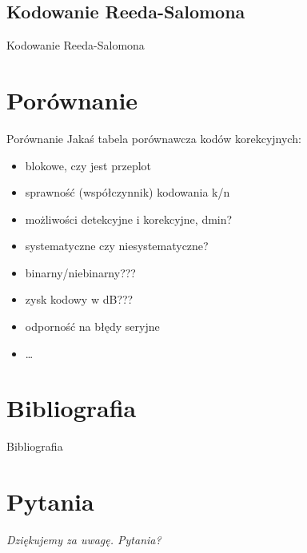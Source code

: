 \documentclass[12pt]{beamer}
\begin{document}
\subsection{Kodowanie Reeda-Salomona}
\begin{frame}{Kodowanie Reeda-Salomona}

\end{frame}

\section{Porównanie}
\begin{frame}{Porównanie}
Jakaś tabela porównawcza kodów korekcyjnych:
\begin{itemize}
		\item blokowe, czy jest przeplot
		\item sprawność (współczynnik) kodowania k/n
		\item możliwości detekcyjne i korekcyjne, dmin?
		\item systematyczne czy niesystematyczne?
		\item binarny/niebinarny???
		\item zysk kodowy w dB???
		\item odporność na błędy seryjne
		\item \ldots
\end{itemize}
		
\end{frame}

\section{Bibliografia}
\begin{frame}{Bibliografia}
	
\end{frame}

\section*{Pytania}
\begin{frame}
	\centering \Large\emph{Dziękujemy za uwagę. Pytania?}
\end{frame}
\end{document}
